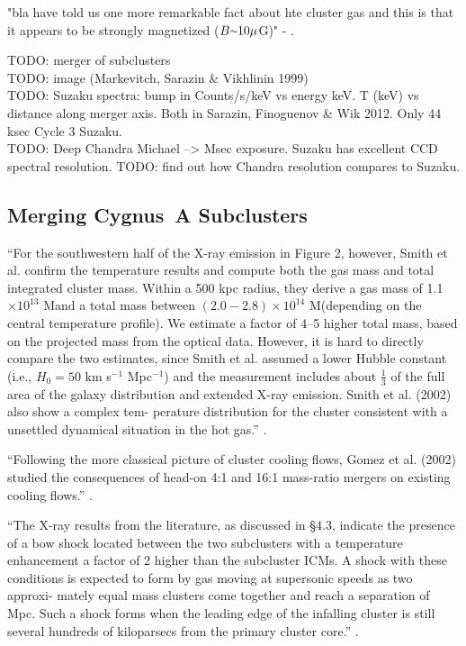 \documentclass[MScProj_TLRH_ClusterEnergy.tex]{subfiles}
\begin{document}
"bla have told us one more remarkable fact about hte cluster gas and this is that it appears to be strongly magnetized ($B \mytilde 10 \mu$G)" - \citep{1996cyga.book..264B}.

TODO: merger of subclusters \\

TODO: image (Markevitch, Sarazin \& Vikhlinin 1999)  \\

TODO: Suzaku spectra: bump in Counts/s/keV vs energy keV. T (keV) vs distance along merger axis. Both in Sarazin, Finoguenov \& Wik 2012. Only 44 ksec Cycle 3 Suzaku. \\

TODO: Deep Chandra Michael --> Msec exposure. Suzaku has excellent CCD spectral resolution. TODO: find out how Chandra resolution compares to Suzaku. \\

\subsection{Merging Cygnus~A Subclusters}
``For the southwestern half of the X-ray emission in Figure 2, however, Smith et al. confirm the  temperature results and compute both the gas mass and total integrated cluster mass. Within a 500 kpc radius, they derive a gas mass of 1.1 $\times 10^{13}$ M\Sun and a total mass between $(2.0 - 2.8) \times 10^{14}$ M\Sun (depending on the central temperature profile). We estimate a factor of 4–5 higher total mass, based on the projected mass from the optical data. However, it is hard to directly compare the two estimates, since Smith et al. assumed a lower Hubble constant (i.e., $H_0 = 50$ km s$^{-1}$ Mpc$^{-1}$) and the  measurement includes about $\frac{1}{3}$ of the full area of the galaxy distribution and extended X-ray emission. Smith et al. (2002) also show a complex tem- perature distribution for the cluster consistent with a unsettled dynamical situation in the hot gas.'' \citep{2005AJ....130...47L}.


``Following the more classical picture of cluster cooling flows, Gomez et al. (2002) studied the consequences of head-on 4:1 and 16:1 mass-ratio mergers on existing cooling flows.'' \citep{2005AJ....130...47L}.

``The X-ray results from the literature, as discussed in \S 4.3, indicate the presence of a bow shock located between the two subclusters with a temperature enhancement a factor of 2 higher than the subcluster ICMs. A shock with these conditions is expected to form by gas moving at supersonic speeds as two approxi- mately equal mass clusters come together and reach a separation of  Mpc. Such a shock forms when the leading edge of the infalling cluster is still several hundreds of kiloparsecs from the primary cluster core.'' \citep{2005AJ....130...47L}.
\end{document}
